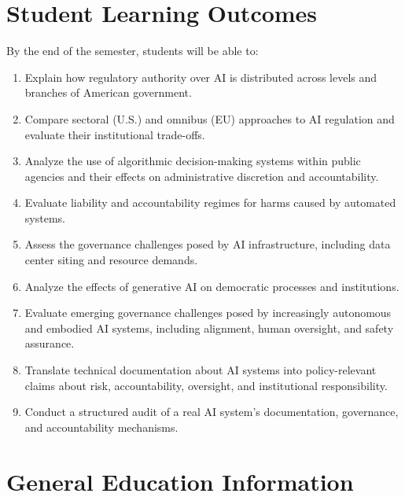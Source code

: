 \documentclass[12pt]{article}
\begin{document}
\section*{Student Learning Outcomes}

{\setlength{\parindent}{0pt}\setlength{\parskip}{0.6\baselineskip}%
By the end of the semester, students will be able to:

\begin{enumerate}
    \item Explain how regulatory authority over AI is distributed across levels and branches of American government.
    \item Compare sectoral (U.S.) and omnibus (EU) approaches to AI regulation and evaluate their institutional trade-offs.
    \item Analyze the use of algorithmic decision-making systems within public agencies and their effects on administrative discretion and accountability.
    \item Evaluate liability and accountability regimes for harms caused by automated systems.
    \item Assess the governance challenges posed by AI infrastructure, including data center siting and resource demands.
    \item Analyze the effects of generative AI on democratic processes and institutions.
    \item Evaluate emerging governance challenges posed by increasingly autonomous and embodied AI systems, including alignment, human oversight, and safety assurance.
    \item Translate technical documentation about AI systems into policy-relevant claims about risk, accountability, oversight, and institutional responsibility.
    \item Conduct a structured audit of a real AI system's documentation, governance, and accountability mechanisms.
\end{enumerate}
}

\section*{General Education Information}
\end{document}
